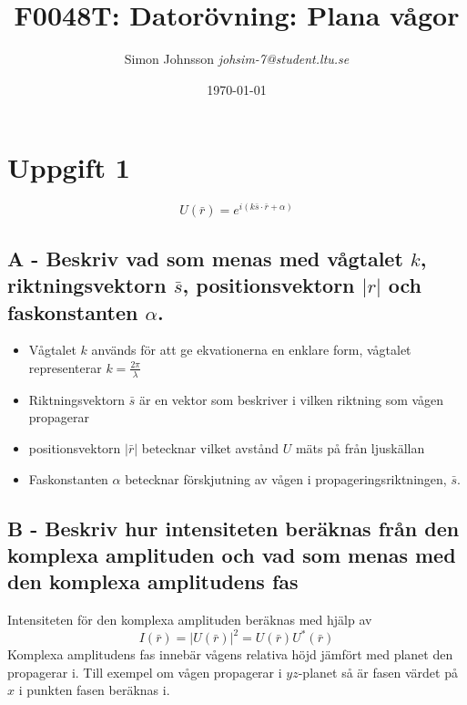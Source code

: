 \documentclass{article}
\begin{document}
\title{F0048T: Datorövning: Plana vågor}
\author{Simon Johnsson \textit{johsim-7@student.ltu.se}}
\date{\today}
\maketitle

\section*{Uppgift 1}
  \[
    U(\bar{r})=e^{i(k\bar{s}\cdot\bar{r}+\alpha)}
  \]
  \subsection*{A - Beskriv vad som menas med vågtalet $k$, riktningsvektorn $\bar{s}$, positionsvektorn $|r|$ och faskonstanten $\alpha$.}
    \begin{itemize}
      \item Vågtalet $k$ används för att ge ekvationerna en enklare form, vågtalet representerar $k=\frac{2\pi}{\lambda}$
      \item Riktningsvektorn $\bar{s}$ är en vektor som beskriver i vilken riktning som vågen propagerar
      \item positionsvektorn $|\bar{r}|$ betecknar vilket avstånd $U$ mäts på från ljuskällan
      \item Faskonstanten $\alpha$ betecknar förskjutning av vågen i propageringsriktningen, $\bar{s}$.
    \end{itemize}
  \subsection*{B - Beskriv hur intensiteten beräknas från den komplexa amplituden och vad som menas med den komplexa amplitudens fas}
    Intensiteten för den komplexa amplituden beräknas med hjälp av
    \[
      I(\bar{r})=|U(\bar{r})|^2=U(\bar{r})U^*(\bar{r})
    \]
    Komplexa amplitudens fas innebär vågens relativa höjd jämfört med planet den propagerar i. Till exempel om vågen propagerar i $yz$-planet så är fasen värdet på $x$ i punkten fasen beräknas i.
\end{document}
